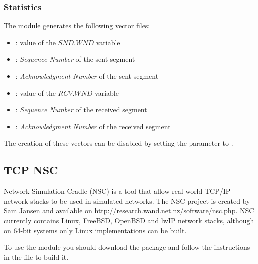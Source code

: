 
\subsubsection*{Statistics}

The  module generates the following vector files:

\begin{itemize}
  \item {}: value of the $SND.WND$ variable
  \item {}: \emph{Sequence Number} of the sent segment
  \item {}: \emph{Acknowledgment Number } of the sent segment
  \item {}: value of the $RCV.WND$ variable
  \item {}: \emph{Sequence Number} of the received segment
  \item {}: \emph{Acknowledgment Number} of the received segment
\end{itemize}

The creation of these vectors can be disabled by setting the 
parameter to .


\subsection{TCP NSC}
\label{sec:tcp_nsc}

Network Simulation Cradle (NSC) is a tool that allow real-world TCP/IP network stacks
to be used in simulated networks. The NSC project is created by Sam Jansen
and available on \url{http://research.wand.net.nz/software/nsc.php}. NSC currently
contains Linux, FreeBSD, OpenBSD and lwIP network stacks, although on 64-bit
systems only Linux implementations can be built.

To use the  module you should download the
 package and follow the instructions
in the  file to build it.

